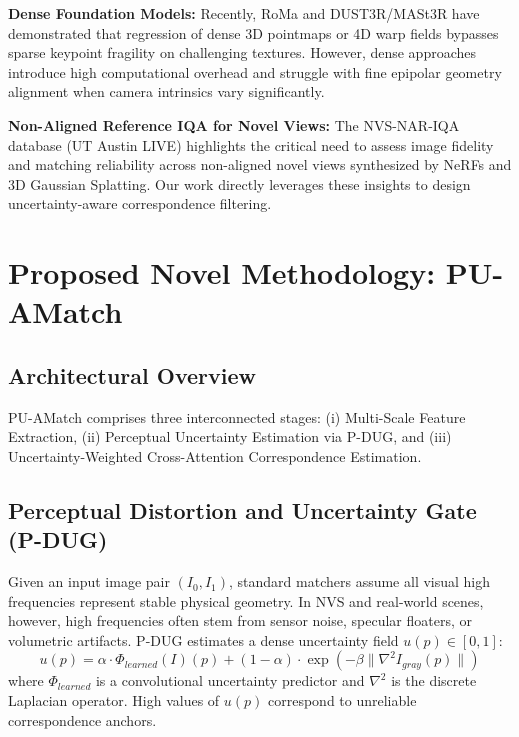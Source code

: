 \documentclass[10pt,twocolumn,letterpaper]{article}
\begin{document}
\noindent\textbf{Dense Foundation Models:} Recently, RoMa and DUST3R/MASt3R have demonstrated that regression of dense 3D pointmaps or 4D warp fields bypasses sparse keypoint fragility on challenging textures. However, dense approaches introduce high computational overhead and struggle with fine epipolar geometry alignment when camera intrinsics vary significantly.

\noindent\textbf{Non-Aligned Reference IQA for Novel Views:} The NVS-NAR-IQA database (UT Austin LIVE) highlights the critical need to assess image fidelity and matching reliability across non-aligned novel views synthesized by NeRFs and 3D Gaussian Splatting. Our work directly leverages these insights to design uncertainty-aware correspondence filtering.

\section{Proposed Novel Methodology: PU-AMatch}
\label{sec:method}

\subsection{Architectural Overview}
PU-AMatch comprises three interconnected stages: (i) Multi-Scale Feature Extraction, (ii) Perceptual Uncertainty Estimation via P-DUG, and (iii) Uncertainty-Weighted Cross-Attention Correspondence Estimation.

\subsection{Perceptual Distortion and Uncertainty Gate (P-DUG)}
Given an input image pair $(I_0, I_1)$, standard matchers assume all visual high frequencies represent stable physical geometry. In NVS and real-world scenes, however, high frequencies often stem from sensor noise, specular floaters, or volumetric artifacts. P-DUG estimates a dense uncertainty field $u(p) \in [0, 1]$:
\begin{equation}
    u(p) = \alpha \cdot \Phi_{learned}(I)(p) + (1 - \alpha) \cdot \exp\left(-\beta \|\nabla^2 I_{gray}(p)\|\right)
\end{equation}
where $\Phi_{learned}$ is a convolutional uncertainty predictor and $\nabla^2$ is the discrete Laplacian operator. High values of $u(p)$ correspond to unreliable correspondence anchors.
\end{document}
